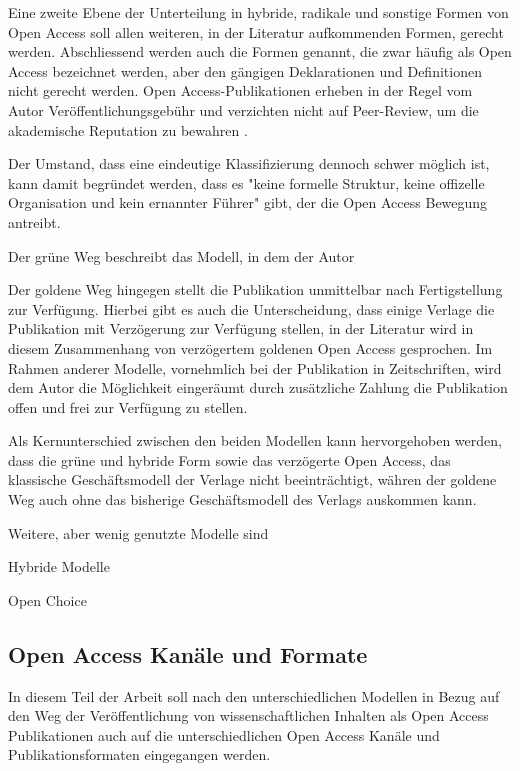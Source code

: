 Eine zweite Ebene der Unterteilung in hybride, radikale und sonstige Formen von Open Access soll allen weiteren, in der Literatur aufkommenden Formen, gerecht werden. Abschliessend werden auch die Formen genannt, die zwar häufig als Open Access bezeichnet werden, aber den gängigen Deklarationen \cite{boai_2012} und Definitionen nicht gerecht werden. Open Access-Publikationen erheben in der Regel vom Autor Veröffentlichungsgebühr und verzichten nicht auf Peer-Review, um die akademische Reputation zu bewahren \cite{albert_2006_open_implications} \cite{Open_Access_net_2009}.

Der Umstand, dass eine eindeutige Klassifizierung dennoch schwer möglich ist, kann damit begründet werden, dass es "keine formelle Struktur, keine offizelle Organisation und kein ernannter Führer" gibt, der die Open Access Bewegung antreibt\cite{poynder_2011_suber}.

Der grüne Weg beschreibt das Modell, in dem der Autor

Der goldene Weg hingegen stellt die Publikation unmittelbar nach Fertigstellung zur Verfügung. Hierbei gibt es auch die Unterscheidung, dass einige Verlage die Publikation mit Verzögerung zur Verfügung stellen, in der Literatur wird in diesem Zusammenhang von verzögertem goldenen Open Access gesprochen\cite{lewis_2012_inevitability}. Im Rahmen anderer Modelle, vornehmlich bei der Publikation in Zeitschriften, wird dem Autor die Möglichkeit eingeräumt durch zusätzliche Zahlung die Publikation offen und frei zur Verfügung zu stellen\cite{lewis_2012_inevitability}.

Als Kernunterschied zwischen den beiden Modellen kann hervorgehoben werden, dass die grüne und hybride Form sowie das verzögerte Open Access, das klassische Geschäftsmodell der Verlage nicht beeinträchtigt, währen der goldene Weg auch ohne das bisherige Geschäftsmodell des Verlags auskommen kann\cite{lewis_2012_inevitability}.

Weitere, aber wenig genutzte Modelle sind

Hybride Modelle

Open Choice \cite{Hess_2006} 

\subsection{Open Access Kanäle und Formate}
In diesem Teil der Arbeit soll nach den unterschiedlichen Modellen in Bezug auf den Weg der Veröffentlichung von wissenschaftlichen Inhalten als Open Access Publikationen auch auf die unterschiedlichen Open Access Kanäle und Publikationsformaten eingegangen werden.

